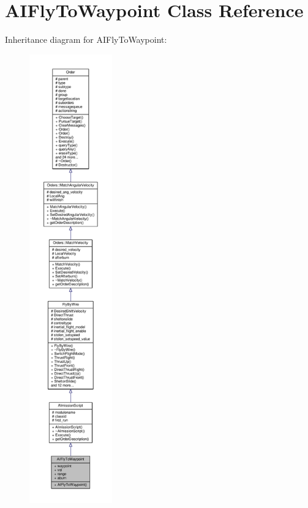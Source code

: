 \hypertarget{classAIFlyToWaypoint}{}\section{A\+I\+Fly\+To\+Waypoint Class Reference}
\label{classAIFlyToWaypoint}


Inheritance diagram for A\+I\+Fly\+To\+Waypoint\+:
\nopagebreak
\begin{figure}[H]
\begin{center}
\leavevmode
\includegraphics[height=550pt]{db/d40/classAIFlyToWaypoint__inherit__graph}
\end{center}
\end{figure}


